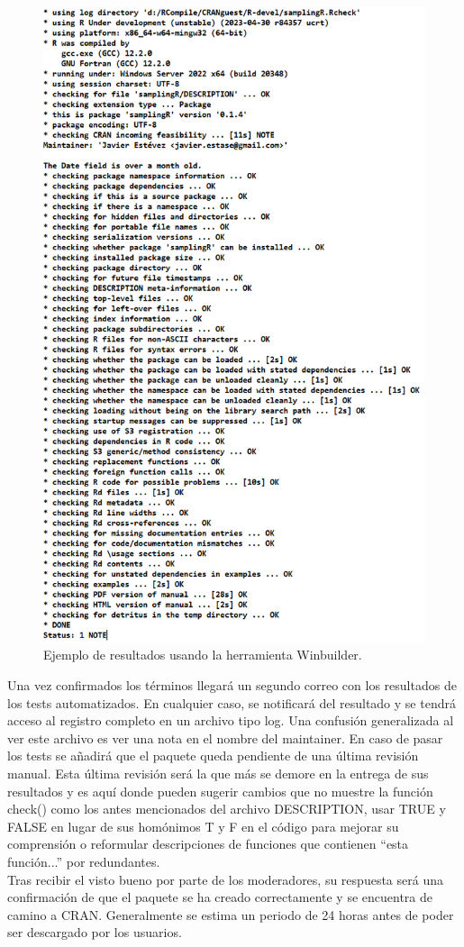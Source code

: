 \begin{figure}[H]
    \centering
    \includegraphics[scale=0.4]{./img/winbuilder.png}
    \caption{Ejemplo de resultados usando la herramienta Winbuilder.}
    \label{fig:enter-label}
\end{figure}

Una vez confirmados los términos llegará un segundo correo con los resultados de los tests automatizados. En cualquier caso, se notificará del resultado y se tendrá acceso al registro completo en un archivo tipo log. Una confusión generalizada al ver este archivo es ver una nota en el nombre del maintainer. En caso de pasar los tests se añadirá que el paquete queda pendiente de una última revisión manual. Esta última revisión será la que más se demore en la entrega de  sus resultados y es aquí donde pueden sugerir cambios que no muestre la función check() como los antes mencionados del archivo DESCRIPTION, usar TRUE y FALSE en lugar de sus homónimos T y F en el código para mejorar su comprensión o reformular descripciones de funciones que contienen ``esta función...'' por redundantes.\\

Tras recibir el visto bueno por parte de los moderadores, su respuesta será una confirmación de que el paquete se ha creado correctamente y se encuentra de camino a CRAN. Generalmente se estima un periodo de 24 horas antes de poder ser descargado por los usuarios.\\
